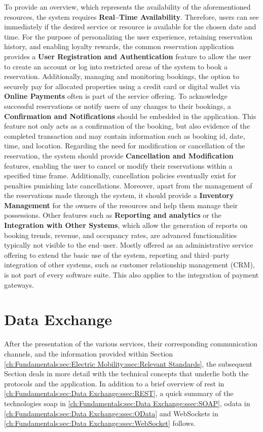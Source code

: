 To provide an overview, which represents the availability of the aforementioned resources, the system requires \textbf{Real--Time Availability}. Therefore, users can see immediately if the desired service or resource is available for the chosen date and time.
For the purpose of personalizing the user experience, retaining reservation history, and enabling loyalty rewards, the common reservation application provides a \textbf{User Registration and Authentication} feature to allow the user to create an account or log into restricted areas of the system to book a reservation.
Additionally, managing and monitoring bookings, the option to securely pay for allocated properties using a credit card or digital wallet via \textbf{Online Payments} often is part of the service offering.
To acknowledge successful reservations or notify users of any changes to their bookings, a \textbf{Confirmation and Notifications} should be embedded in the application. This feature not only acts as a confirmation of the booking, but also evidence of the completed transaction and may contain information such as booking \acrshort{id}, date, time, and location.
Regarding the need for modification or cancellation of the reservation, the system should provide \textbf{Cancellation and Modification} features, enabling the user to cancel or modify their reservations within a specified time frame. Additionally, cancellation policies eventually exist for penalties punishing late cancellations.
Moreover, apart from the management of the reservations made through the system, it should provide a \textbf{Inventory Management} for the owners of the resources and help them manage their possessions.
Other features such as \textbf{Reporting and analytics} or the \textbf{Integration with Other Systems}, which allow the generation of reports on booking trends, revenue, and occupancy rates, are advanced functionalities typically not visible to the end--user. Mostly offered as an administrative service offering to extend the basic use of the system, reporting and third--party integration of other systems, such as customer relationship management (CRM), is not part of every software suite. 
This also applies to the integration of payment gateways.

\section{Data Exchange}
\label{ch:Fundamentals:sec:Data Exchange}

After the presentation of the various services, their corresponding communication channels, and the information provided within Section \ref{ch:Fundamentals:sec:Electric Mobility:ssec:Relevant Standards}, the subsequent Section deals in more detail with the technical concepts that underlie both the protocols and the application.
In addition to a brief overview of \acrfull{rest} in \ref{ch:Fundamentals:sec:Data Exchange:ssec:REST}, a quick summary of the technologies \acrfull{soap} in \ref{ch:Fundamentals:sec:Data Exchange:ssec:SOAP}, \acrfull{odata} in \ref{ch:Fundamentals:sec:Data Exchange:ssec:OData} and WebSockets in \ref{ch:Fundamentals:sec:Data Exchange:ssec:WebSocket} follows. 

